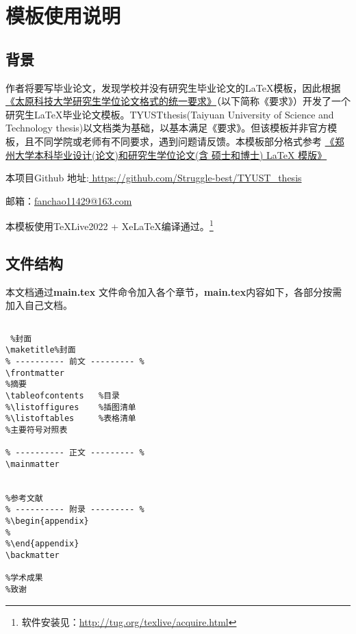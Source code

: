 \linespread{1.55}\selectfont
\chapter{模板使用说明}
\section{背景}
作者将要写毕业论文，发现学校并没有研究生毕业论文的\LaTeX 模板，因此根据\href{https://yjsxy.tyust.edu.cn/info/1172/3275.htm}{《太原科技大学研究生学位论文格式的统一要求》}（以下简称《要求》）开发了一个研究生\LaTeX 毕业论文模板。TYUSTthesis(Taiyuan University of Science and Technology thesis)以文档类为基础，以基本满足《要求》。但该模板并非官方模板，且不同学院或老师有不同要求，遇到问题请反馈。本模板部分格式参考
\href{https://github.com/tuxify/zzuthesis}{《郑州大学本科毕业设计(论文)和研究生学位论文(含 硕士和博士) LaTeX 模版》}

本项目Github 地址\faGithub :\href{https://github.com/Struggle-best/TYUST_thesis}{ \;\;https://github.com/Struggle-best/TYUST\_thesis}

邮箱：\href{fanchao11429@163.com}{fanchao11429@163.com}

本模板使用\TeX Live2022 + Xe\LaTeX 编译通过。\footnote{软件安装见：\url{http://tug.org/texlive/acquire.html}}
\section{文件结构}
本文档通过\textbf{main.tex} 文件\myverb{}命令加入各个章节，\textbf{main.tex}内容如下，各部分按需加入自己文档。

\begin{lstlisting}

 %封面
\maketitle%封面
% ---------- 前文 --------- %
\frontmatter
%摘要
\tableofcontents   %目录
%\listoffigures    %插图清单
%\listoftables     %表格清单
%主要符号对照表

% ---------- 正文 --------- %
\mainmatter


%参考文献
% ---------- 附录 --------- %
%\begin{appendix}
%	
%\end{appendix}
\backmatter

%学术成果
%致谢

\end{lstlisting}
